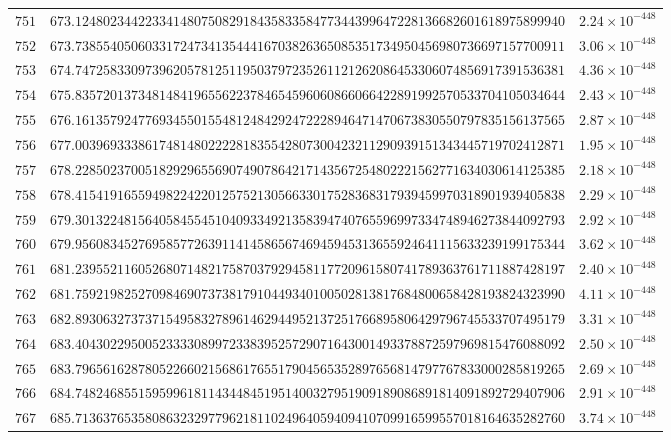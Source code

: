 \documentclass[12pt,reqno]{amsart}
\theoremstyle{remark}
\begin{document}
\begin{longtable}{clc}
$751$ & $673.1248023442233414807508291843583358477344399647228136682601618975899940$ & $2.24\times 10^{-448}$ \\
$752$ & $673.7385540506033172473413544416703826365085351734950456980736697157700911$ & $3.06\times 10^{-448}$ \\
$753$ & $674.7472583309739620578125119503797235261121262086453306074856917391536381$ & $4.36\times 10^{-448}$ \\
$754$ & $675.8357201373481484196556223784654596060866066422891992570533704105034644$ & $2.43\times 10^{-448}$ \\
$755$ & $676.1613579247769345501554812484292472228946471470673830550797835156137565$ & $2.87\times 10^{-448}$ \\
$756$ & $677.0039693338617481480222281835542807300423211290939151343445719702412871$ & $1.95\times 10^{-448}$ \\
$757$ & $678.2285023700518292965569074907864217143567254802221562771634030614125385$ & $2.18\times 10^{-448}$ \\
$758$ & $678.4154191655949822422012575213056633017528368317939459970318901939405838$ & $2.29\times 10^{-448}$ \\
$759$ & $679.3013224815640584554510409334921358394740765596997334748946273844092793$ & $2.92\times 10^{-448}$ \\
$760$ & $679.9560834527695857726391141458656746945945313655924641115633239199175344$ & $3.62\times 10^{-448}$ \\
$761$ & $681.2395521160526807148217587037929458117720961580741789363761711887428197$ & $2.40\times 10^{-448}$ \\
$762$ & $681.7592198252709846907373817910449340100502813817684800658428193824323990$ & $4.11\times 10^{-448}$ \\
$763$ & $682.8930632737371549583278961462944952137251766895806429796745533707495179$ & $3.31\times 10^{-448}$ \\
$764$ & $683.4043022950052333308997233839525729071643001493378872597969815476088092$ & $2.50\times 10^{-448}$ \\
$765$ & $683.7965616287805226602156861765517904565352897656814797767833000285819265$ & $2.69\times 10^{-448}$ \\
$766$ & $684.7482468551595996181143448451951400327951909189086891814091892729407906$ & $2.91\times 10^{-448}$ \\
$767$ & $685.7136376535808632329779621811024964059409410709916599557018164635282760$ & $3.74\times 10^{-448}$ \\

\end{longtable}
\end{document}
